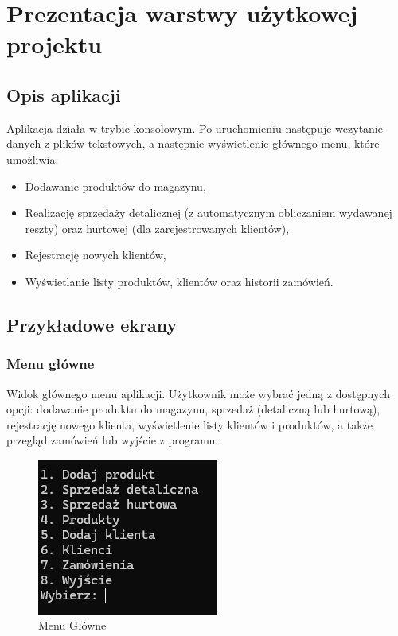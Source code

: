 \chapter{Prezentacja warstwy użytkowej projektu}
\section{Opis aplikacji}
Aplikacja działa w trybie konsolowym. Po uruchomieniu następuje wczytanie danych z plików tekstowych, a następnie wyświetlenie głównego menu, które umożliwia:
\begin{itemize}
    \item Dodawanie produktów do magazynu,
    \item Realizację sprzedaży detalicznej (z automatycznym obliczaniem wydawanej reszty) oraz hurtowej (dla zarejestrowanych klientów),
    \item Rejestrację nowych klientów,
    \item Wyświetlanie listy produktów, klientów oraz historii zamówień.
\end{itemize}

\section{Przykładowe ekrany}
\subsection{Menu główne}
Widok głównego menu aplikacji. Użytkownik może wybrać jedną z dostępnych opcji: dodawanie produktu do magazynu, sprzedaż (detaliczną lub hurtową), rejestrację nowego klienta, wyświetlenie listy klientów i produktów, a także przegląd zamówień lub wyjście z programu.
\begin{figure}[ht]
    \centering
    \includegraphics[width=0.5\linewidth]{figures/Menu.png}
    \caption{Menu Główne}
\end{figure}

